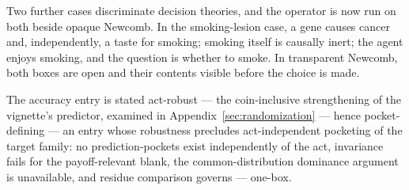 Two further cases discriminate decision theories, and the operator is now run on both beside opaque Newcomb. In the smoking-lesion case, a gene causes cancer and, independently, a taste for smoking; smoking itself is causally inert; the agent enjoys smoking, and the question is whether to smoke. In transparent Newcomb, both boxes are open and their contents visible before the choice is made.

\begin{corollary}[Newcomb]
\label{cor:newcomb-sort}
The accuracy entry is stated act-robust --- the coin-inclusive strengthening of the vignette's predictor, examined in Appendix~\ref{sec:randomization} --- hence pocket-defining --- an entry whose robustness precludes act-independent pocketing of the target family: no prediction-pockets exist independently of the act, invariance fails for the payoff-relevant blank, the common-distribution dominance argument is unavailable, and residue comparison governs --- one-box.
\end{corollary}

